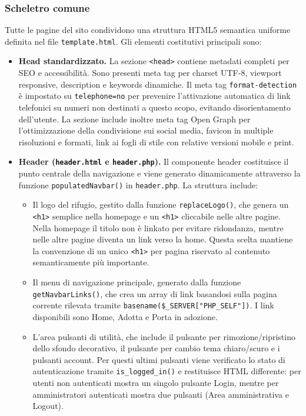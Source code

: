 \documentclass[a4paper,10pt]{article}
\begin{document}
    \subsubsection{Scheletro comune}
	Tutte le pagine del sito condividono una struttura HTML5 semantica uniforme definita nel file \texttt{template.html}. Gli elementi costitutivi principali sono:

	\begin{itemize}
    \item \textbf{Head standardizzato.} 
    La sezione \texttt{<head>} contiene metadati completi per SEO e accessibilità. Sono presenti meta tag per charset UTF-8, viewport responsive, description e keywords dinamiche. Il meta tag \texttt{format-detection} è impostato su \texttt{telephone=no} per prevenire l'attivazione automatica di link telefonici su numeri non destinati a questo scopo, evitando disorientamento dell'utente. La sezione include inoltre meta tag Open Graph per l'ottimizzazione della condivisione sui social media, favicon in multiple risoluzioni e formati, link ai fogli di stile con relative versioni mobile e print.

    \item \textbf{Header (\texttt{header.html} e \texttt{header.php}).} 
    Il componente header costituisce il punto centrale della navigazione e viene generato dinamicamente attraverso la funzione \texttt{populatedNavbar()} in \texttt{header.php}. La struttura include:
    \begin{itemize}
    \item Il logo del rifugio, gestito dalla funzione \texttt{replaceLogo()}, che genera un \texttt{<h1>} semplice nella homepage e un \texttt{<h1>} cliccabile nelle altre pagine. Nella homepage il titolo non è linkato per evitare ridondanza, mentre nelle altre pagine diventa un link verso la home. Questa scelta mantiene la convenzione di un unico \texttt{<h1>} per pagina riservato al contenuto semanticamente più importante.

    \item Il menu di navigazione principale, generato dalla funzione \texttt{getNavbarLinks()}, che crea un array di link basandosi sulla pagina corrente rilevata tramite \texttt{basename(\$\_SERVER["PHP\_SELF"])}. I link disponibili sono Home, Adotta e Porta in adozione.

    \item L'area pulsanti di utilità, che include il pulsante per rimozione/ripristino dello sfondo decorativo, il pulsante per cambio tema chiaro/scuro e i pulsanti account. Per questi ultimi pulsanti viene verificato lo stato di autenticazione tramite \texttt{is\_logged\_in()} e restituisce HTML differente: per utenti non autenticati mostra un singolo pulsante Login, mentre per amministratori autenticati mostra due pulsanti (Area amministrativa e Logout).
    \end{itemize}


\end{itemize}
\end{document}
